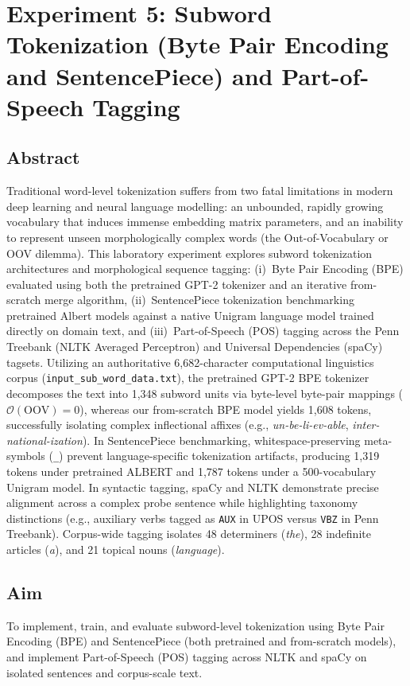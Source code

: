 \chapter{Experiment 5: Subword Tokenization (Byte Pair Encoding and SentencePiece) and Part-of-Speech Tagging}
\label{chap:exp5}

\section{Abstract}
Traditional word-level tokenization suffers from two fatal limitations in modern deep learning and neural language modelling: an unbounded, rapidly growing vocabulary that induces immense embedding matrix parameters, and an inability to represent unseen morphologically complex words (the Out-of-Vocabulary or OOV dilemma). This laboratory experiment explores subword tokenization architectures and morphological sequence tagging: (i)~Byte Pair Encoding (BPE) evaluated using both the pretrained GPT-2 tokenizer and an iterative from-scratch merge algorithm, (ii)~SentencePiece tokenization benchmarking pretrained Albert models against a native Unigram language model trained directly on domain text, and (iii)~Part-of-Speech (POS) tagging across the Penn Treebank (NLTK Averaged Perceptron) and Universal Dependencies (spaCy) tagsets. Utilizing an authoritative 6,682-character computational linguistics corpus (\texttt{input\_sub\_word\_data.txt}), the pretrained GPT-2 BPE tokenizer decomposes the text into 1,348 subword units via byte-level byte-pair mappings ($\mathcal{O}(\text{OOV}) = 0$), whereas our from-scratch BPE model yields 1,608 tokens, successfully isolating complex inflectional affixes (e.g., \textit{un-be-li-ev-able}, \textit{inter-national-ization}). In SentencePiece benchmarking, whitespace-preserving meta-symbols (\texttt{\_}) prevent language-specific tokenization artifacts, producing 1,319 tokens under pretrained ALBERT and 1,787 tokens under a 500-vocabulary Unigram model. In syntactic tagging, spaCy and NLTK demonstrate precise alignment across a complex probe sentence while highlighting taxonomy distinctions (e.g., auxiliary verbs tagged as \texttt{AUX} in UPOS versus \texttt{VBZ} in Penn Treebank). Corpus-wide tagging isolates 48 determiners (\textit{the}), 28 indefinite articles (\textit{a}), and 21 topical nouns (\textit{language}).

\section{Aim}
To implement, train, and evaluate subword-level tokenization using Byte Pair Encoding (BPE) and SentencePiece (both pretrained and from-scratch models), and implement Part-of-Speech (POS) tagging across NLTK and spaCy on isolated sentences and corpus-scale text.

